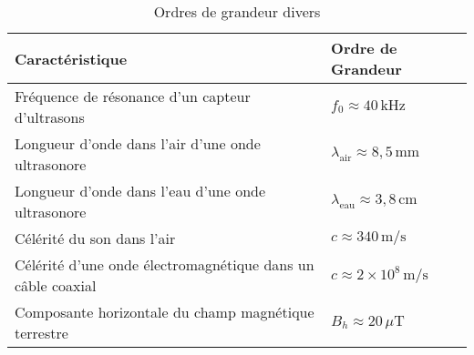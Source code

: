 \documentclass[10pt]{article}
\begin{document}
\begin{multicols}{2}
\begin{table}[H]
\centering
\caption{Ordres de grandeur divers}
\begin{tabular}{|l|l|}
\hline
\textbf{Caractéristique} & \textbf{Ordre de Grandeur} \\ \hline
Fréquence de résonance d’un capteur d’ultrasons & \(f_0 \approx 40\,\text{kHz}\) \\ \hline
Longueur d’onde dans l’air d’une onde ultrasonore & \(\lambda_{\text{air}} \approx 8,5\,\text{mm}\) \\ \hline
Longueur d’onde dans l’eau d’une onde ultrasonore & \(\lambda_{\text{eau}} \approx 3,8\,\text{cm}\) \\ \hline
Célérité du son dans l’air & \(c \approx 340\,\text{m/s}\) \\ \hline
Célérité d’une onde électromagnétique dans un câble coaxial & \(c \approx 2 \times 10^8\,\text{m/s}\) \\ \hline
Composante horizontale du champ magnétique terrestre & \(B_h \approx 20\,\mu\text{T}\) \\ \hline
\end{tabular}
\end{table}


































\end{multicols}
\end{document}
